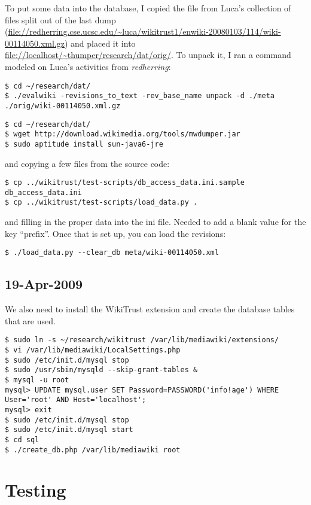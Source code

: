 To put some data into the database, I copied the
file  from Luca's collection
of files split out of the last dump
(\url{file://redherring.cse.ucsc.edu/~luca/wikitrust1/enwiki-20080103/114/wiki-00114050.xml.gz})
and placed it into \url{file://localhost/~thumper/research/dat/orig/}.
To unpack it, I ran a command modeled on Luca's activities from
\textit{redherring}:
\begin{verbatim}
$ cd ~/research/dat/
$ ./evalwiki -revisions_to_text -rev_base_name unpack -d ./meta ./orig/wiki-00114050.xml.gz
\end{verbatim}

\begin{verbatim}
$ cd ~/research/dat/
$ wget http://download.wikimedia.org/tools/mwdumper.jar
$ sudo aptitude install sun-java6-jre
\end{verbatim}
and copying a few files from the source code:
\begin{verbatim}
$ cp ../wikitrust/test-scripts/db_access_data.ini.sample db_access_data.ini
$ cp ../wikitrust/test-scripts/load_data.py .
\end{verbatim}
and filling in the proper data into the ini file.
Needed to add a blank value for the key ``prefix''.
Once that is set up, you can load the revisions:
\begin{verbatim}
$ ./load_data.py --clear_db meta/wiki-00114050.xml
\end{verbatim}

\subsection{19-Apr-2009}

We also need to install the WikiTrust extension and
create the database tables that are used.
\begin{verbatim}
$ sudo ln -s ~/research/wikitrust /var/lib/mediawiki/extensions/
$ vi /var/lib/mediawiki/LocalSettings.php
$ sudo /etc/init.d/mysql stop
$ sudo /usr/sbin/mysqld --skip-grant-tables &
$ mysql -u root
mysql> UPDATE mysql.user SET Password=PASSWORD('info!age') WHERE User='root' AND Host='localhost';
mysql> exit
$ sudo /etc/init.d/mysql stop
$ sudo /etc/init.d/mysql start
$ cd sql
$ ./create_db.php /var/lib/mediawiki root
\end{verbatim}


\section{Testing}
\label{sec:up2date-testing}


